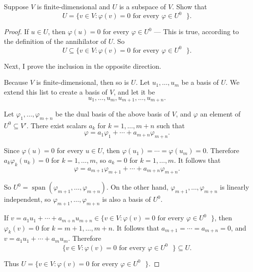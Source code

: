\begin{exercise}\label{chapter3:sectionF:exercise20}
    Suppose $V$ is finite-dimensional and $U$ is a subspace of $V$. Show that
    \[
        U = \{  v\in V: \varphi(v) = 0 \text{ for every $\varphi \in U^{0}$ } \}.
    \]
\end{exercise}

\begin{proof}
    If $u\in U$, then $\varphi(u) = 0$ for every $\varphi\in U^{0}$ --- This is true, according to the definition of the annihilator of $U$. So
    \[
        U \subseteq \{  v\in V: \varphi(v) = 0 \text{ for every $\varphi \in U^{0}$ } \}.
    \]

    Next, I prove the inclusion in the opposite direction.

    Because $V$ is finite-dimensional, then so is $U$. Let $u_{1}, \ldots, u_{m}$ be a basis of $U$. We extend this list to create a basis of $V$, and let it be
    \[
        u_{1}, \ldots, u_{m}, u_{m+1}, \ldots, u_{m+n}.
    \]

    Let $\varphi_{1}, \ldots, \varphi_{m+n}$ be the dual basis of the above basis of $V$, and $\varphi$ an element of $U^{0}\subseteq V'$. There exist scalars $a_{k}$ for $k = 1, \ldots, m+n$ such that
    \[
        \varphi = a_{1}\varphi_{1} + \cdots + a_{m+n}\varphi_{m+n}.
    \]

    Since $\varphi(u) = 0$ for every $u\in U$, then $\varphi(u_{1}) = \cdots = \varphi(u_{m}) = 0$. Therefore $a_{k}\varphi_{k}(u_{k}) = 0$ for $k = 1,\ldots, m$, so $a_{k} = 0$ for $k = 1,\ldots, m$. It follows that
    \[
        \varphi = a_{m+1}\varphi_{m+1} + \cdots + a_{m+n}\varphi_{m+n}.
    \]

    So $U^{0} = \operatorname{span}(\varphi_{m+1}, \ldots, \varphi_{m+n})$. On the other hand, $\varphi_{m+1}, \ldots, \varphi_{m+n}$ is linearly independent, so $\varphi_{m+1}, \ldots, \varphi_{m+n}$ is also a basis of $U^{0}$.

    If $v = a_{1}u_{1} + \cdots + a_{m+n}u_{m+n}\in \{  v\in V: \varphi(v) = 0 \text{ for every $\varphi \in U^{0}$ } \}$, then $\varphi_{k}(v) = 0$ for $k = m+1, \ldots, m+n$. It follows that $a_{m+1} = \cdots = a_{m+n} = 0$, and $v = a_{1}u_{1} + \cdots + a_{m}u_{m}$. Therefore
    \[
        \{  v\in V: \varphi(v) = 0 \text{ for every $\varphi \in U^{0}$ } \}\subseteq U.
    \]

    Thus $U = \{  v\in V: \varphi(v) = 0 \text{ for every $\varphi \in U^{0}$ } \}$.
\end{proof}
\newpage

